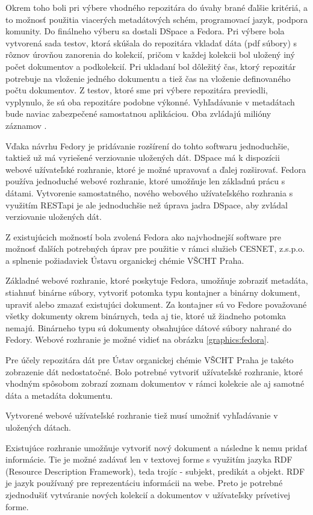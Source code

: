 \documentclass[thesis=M,slovak]{FITthesis}[2013/05/06]
\begin{document}
Okrem toho boli pri výbere vhodného repozitára do úvahy brané ďalšie kritériá, a to možnosť použitia viacerých metadátových schém, programovací jazyk, podpora komunity. Do finálneho výberu sa dostali DSpace a Fedora. Pri výbere bola vytvorená sada testov, ktorá skúšala do repozitára vkladať dáta (pdf súbory) s rôznov úrovňou zanorenia do kolekcií, pričom v každej kolekcii bol uložený iný počet dokumentov a podkolekcií. Pri ukladaní bol dôležitý čas, ktorý repozitár potrebuje na vloženie jedného dokumentu a tiež čas na vloženie definovaného počtu dokumentov. Z testov, ktoré sme pri výbere repozitára previedli, vyplynulo, že sú oba repozitáre podobne výkonné. Vyhľadávanie v metadátach bude naviac zabezpečené samostatnou aplikáciou. Oba zvládajú milióny záznamov \cite{Fedora} \cite[s.~213]{DigitalLibrary}.

Vďaka návrhu Fedory je pridávanie rozšírení do tohto softwaru jednoduchšie, taktiež už má vyriešené verziovanie uložených dát. DSpace má k dispozícii webové užívateľské rozhranie, ktoré je možné upravovať a ďalej rozširovať. Fedora používa jednoduché webové rozhranie, ktoré umožňuje len základnú prácu s dátami. Vytvorenie samostatného, nového webového užívateľského rozhrania s využitím RESTapi je ale jednoduchšie než úprava jadra DSpace, aby zvládal verziovanie uložených dát.

Z existujúcich možností bola zvolená Fedora ako najvhodnejší software pre možnosť ďalších potrebných úprav pre použitie v rámci služieb CESNET, z.s.p.o. a splnenie požiadaviek Ústavu organickej chémie VŠCHT Praha.

Základné webové rozhranie, ktoré poskytuje Fedora, umožňuje zobraziť metadáta, stiahnuť binárne súbory, vytvoriť potomka typu kontajner a binárny dokument, upraviť alebo zmazať existujúci dokument. Za kontajner sú vo Fedore považované všetky dokumenty okrem binárnych, teda aj tie, ktoré už žiadneho potomka nemajú. Binárneho typu sú dokumenty obsahujúce dátové súbory nahrané do Fedory. Webové rozhranie je možné vidieť na obrázku \ref{graphics:fedora}.

Pre účely repozitára dát pre Ústav organickej chémie VŠCHT Praha je takéto zobrazenie dát nedostatočné. Bolo potrebné vytvoriť užívateľské rozhranie, ktoré vhodným spôsobom zobrazí zoznam dokumentov v rámci kolekcie ale aj samotné dáta a metadáta dokumentu.

Vytvorené webové užívateľské rozhranie tiež musí umožniť vyhľadávanie v uložených dátach.

Existujúce rozhranie umožňuje vytvoriť nový dokument a následne k nemu pridať informácie. Tie je možné zadávať len v textovej forme s využitím jazyka RDF (Resource Description Framework), teda trojíc - subjekt, predikát a objekt. RDF je jazyk používaný pre reprezentáciu informácii na webe. \cite{RDF} Preto je potrebné zjednodušiť vytváranie nových kolekcií a dokumentov v užívateľsky prívetivej forme.
\end{document}

